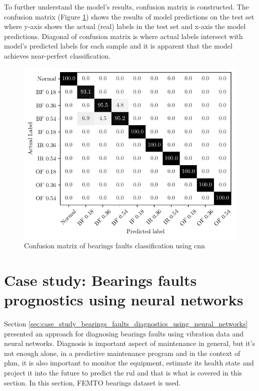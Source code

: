 To further understand the model's results, confusion matrix is constructed. The confusion matrix (Figure \ref{fig:bearings_faults_classification_confusion_matrix}) shows the results of model predictions on the test set where y-axis shows the actual (real) labels in the test set and x-axis the model predictions. Diagonal of confusion matrix is where actual labels intersect with model's predicted labels for each sample and it is apparent that the model achieves near-perfect classification.

\begin{figure}[h]
    \centering
    \includegraphics{figures/cw_bearings_faults_classification.pdf}
    \caption{Confusion matrix of bearings faults classification using \acrshort{cnn}}
    \label{fig:bearings_faults_classification_confusion_matrix}
\end{figure}

\section{Case study: Bearings faults prognostics using neural networks}%
\label{sec:case_study_bearings_faults_prognostics_using_neural_networks}

Section \ref{sec:case_study_bearings_faults_diagnostics_using_neural_networks} presented an approach for diagnosing bearings faults using vibration data and neural networks. Diagnosis is important aspect of maintenance in general, but it's not enough alone, in a predictive maintenance program and in the context of \acrshort{phm}, it is also important to monitor the equipment, estimate its health state and project it into the future to predict the \acrshort{rul} and that is what is covered in this section. In this section, FEMTO bearings dataset is used.

